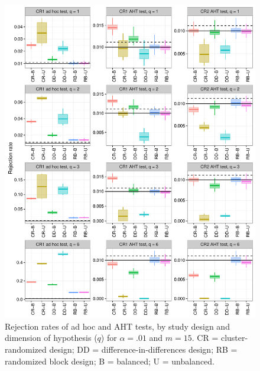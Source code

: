 \documentclass{article}\usepackage[]{graphicx}\usepackage[]{color}
\newenvironment{knitrout}{}{} %
\begin{document}
\begin{knitrout}
\color{fgcolor}\begin{figure}[H]

{\centering \includegraphics[width=\linewidth]{CR_fig/balance_01_15-1} 

}

\caption[Rejection rates of ad hoc and AHT tests, by study design and dimension of hypothesis (]{Rejection rates of ad hoc and AHT tests, by study design and dimension of hypothesis ($q$) for $\alpha = .01$ and $m = 15$. CR = cluster-randomized design; DD = difference-in-differences design; RB = randomized block design; B = balanced; U = unbalanced.}\label{fig:balance_01_15}
\end{figure}


\end{knitrout}
\end{document}
